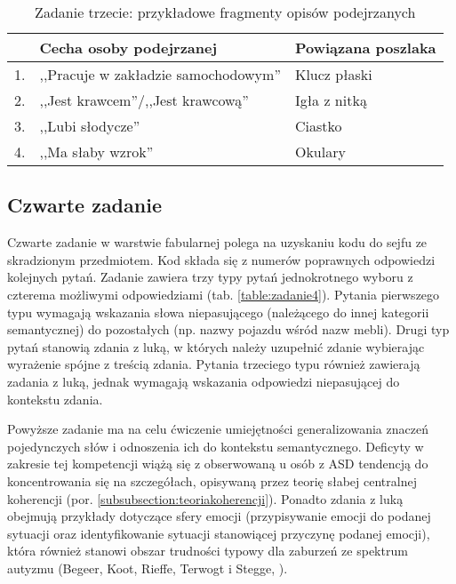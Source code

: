     \begin{table}
        \begin{tabularx}{\textwidth}{ l X X }
         \hline
        
         \hline
          & \textbf{Cecha osoby podejrzanej} & \textbf{Powiązana poszlaka} \\
          \hline
         1. & ,,Pracuje w zakładzie samochodowym'' & Klucz płaski \\
         2. & ,,Jest krawcem''/,,Jest krawcową'' & Igła z nitką \\
         3. & ,,Lubi słodycze'' & Ciastko \\
         4. & ,,Ma słaby wzrok'' & Okulary \\
         \hline
         
         \hline
        \end{tabularx}
        \caption{Zadanie trzecie: przykładowe fragmenty opisów podejrzanych}
        \label{table:zadanie3}
    \end{table}
    
    \subsection{Czwarte zadanie}
    Czwarte zadanie w warstwie fabularnej polega na uzyskaniu kodu do sejfu ze skradzionym przedmiotem.
    Kod składa się z numerów poprawnych odpowiedzi kolejnych pytań.
    Zadanie zawiera trzy typy pytań jednokrotnego wyboru z czterema możliwymi odpowiedziami (tab. \ref{table:zadanie4}).
    Pytania pierwszego typu wymagają wskazania słowa niepasującego (należącego do innej kategorii semantycznej) do pozostałych (np. nazwy pojazdu wśród nazw mebli).
    Drugi typ pytań stanowią zdania z luką, w których należy uzupełnić zdanie wybierając wyrażenie spójne z treścią zdania.
    Pytania trzeciego typu również zawierają zadania z luką, jednak wymagają wskazania odpowiedzi niepasującej do kontekstu zdania.
    
    Powyższe zadanie ma na celu ćwiczenie umiejętności generalizowania znaczeń pojedynczych słów i odnoszenia ich do kontekstu semantycznego.
    Deficyty w zakresie tej kompetencji wiążą się z obserwowaną u osób z ASD tendencją do koncentrowania się na szczegółach, opisywaną przez teorię słabej centralnej koherencji (por. \ref{subsubsection:teoriakoherencji}).
    Ponadto zdania z luką obejmują przykłady dotyczące sfery emocji (przypisywanie emocji do podanej sytuacji oraz identyfikowanie sytuacji stanowiącej przyczynę podanej emocji), która również stanowi obszar trudności typowy dla zaburzeń ze spektrum autyzmu (Begeer, Koot, Rieffe, Terwogt i Stegge, \cite*{begeer2008emotional}).
    
